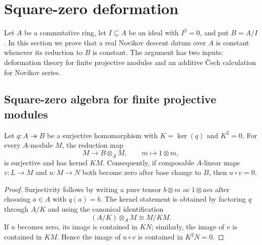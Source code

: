 \section{Square-zero deformation}
\label{sec:square_zero_deformation}

Let $A$ be a commutative ring, let $I\subseteq A$ be an ideal with
$I^2=0$, and put $B=A/I$.  In this section we prove that a real Novikov
descent datum over $A$ is constant whenever its reduction to $B$ is constant.
The argument has two inputs: deformation theory for finite projective modules
and an additive \v{C}ech calculation for Novikov series.

\subsection{Square-zero algebra for finite projective modules}

\begin{lemma}
  \label{lem:square_zero_base_change}
  \leanok
  Let $q\colon A\twoheadrightarrow B$ be a surjective homomorphism with
  $K=\ker(q)$ and $K^2=0$.  For every $A$-module $M$, the reduction map
  \[
    M\longrightarrow B\otimes_A M,\qquad m\longmapsto 1\otimes m,
  \]
  is surjective and has kernel $KM$.  Consequently, if composable
  $A$-linear maps $v\colon L\to M$ and $u\colon M\to N$ both become zero
  after base change to $B$, then $u\circ v=0$.
\end{lemma}

\begin{proof}
  \leanok
  Surjectivity follows by writing a pure tensor $b\otimes m$ as
  $1\otimes am$ after choosing $a\in A$ with $q(a)=b$.  The kernel statement
  is obtained by factoring $q$ through $A/K$ and using the canonical
  identification
  \[
    (A/K)\otimes_A M\cong M/KM.
  \]
  If $u$ becomes zero, its image is contained in $KN$; similarly, the image
  of $v$ is contained in $KM$.  Hence the image of $u\circ v$ is contained in
  $K^2N=0$.
\end{proof}


